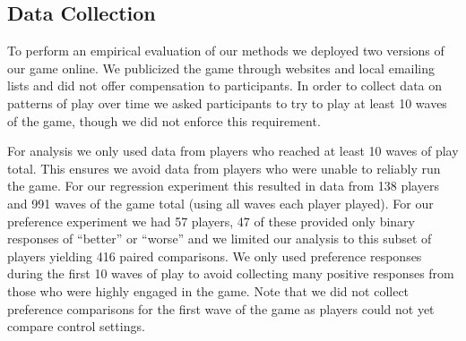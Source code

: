 \documentclass{sig-alternate}
\begin{document}
%

%

%


\subsection{Data Collection}

To perform an empirical evaluation of our methods we deployed two versions of our game online.
We publicized the game through websites and local emailing lists and did not offer compensation to participants.
In order to collect data on patterns of play over time we asked participants to try to play at least 10 waves of the game, though we did not enforce this requirement.

For analysis we only used data from players who reached at least 10 waves of play total.
This ensures we avoid data from players who were unable to reliably run the game.
For our regression experiment this resulted in data from 138 players and 991 waves of the game total (using all waves each player played).
For our preference experiment we had 57 players, 47 of these provided only binary responses of ``better'' or ``worse'' and we limited our analysis to this subset of players yielding 416 paired comparisons.
We only used preference responses during the first 10 waves of play to avoid collecting many positive responses from those who were highly engaged in the game.
Note that we did not collect preference comparisons for the first wave of the game as players could not yet compare control settings.
\end{document}
